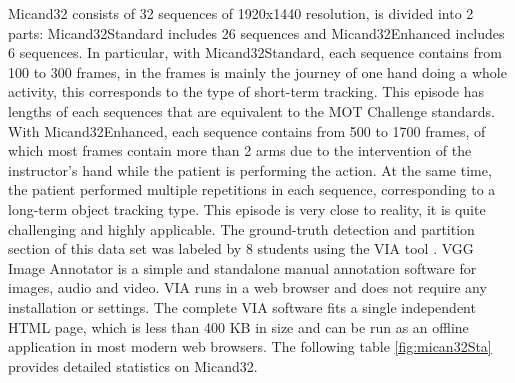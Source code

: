 Micand32 consists of 32 sequences of 1920x1440 resolution, is divided into 2 parts: Micand32Standard includes 26 sequences and Micand32Enhanced includes 6 sequences. In particular, with Micand32Standard, each sequence contains from 100 to 300 frames, in the frames is mainly the journey of one hand doing a whole activity, this corresponds to the type of short-term tracking. This episode has lengths of each sequences that are equivalent to the MOT Challenge standards. With Micand32Enhanced, each sequence contains from 500 to 1700 frames, of which most frames contain more than 2 arms due to the intervention of the instructor's hand while the patient is performing the action. At the same time, the patient performed multiple repetitions in each sequence, corresponding to a long-term object tracking type. This episode is very close to reality, it is quite challenging and highly applicable. The ground-truth detection and partition section of this data set was labeled by 8 students using the VIA tool \cite{10.1145/3343031.3350535}. VGG Image Annotator is a simple and standalone manual annotation software for images, audio and video. VIA runs in a web browser and does not require any installation or settings. The complete VIA software fits a single independent HTML page, which is less than 400 KB in size and can be run as an offline application in most modern web browsers. The following table \ref{fig:mican32Sta} provides detailed statistics on Micand32.
